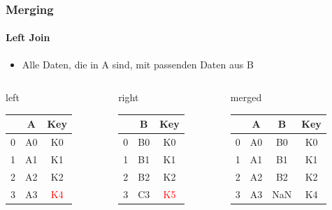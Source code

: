 \documentclass[12pt,ngerman]{beamer}
\def\firstcircle{(0,0) circle (2cm)}
\def\secondcircle{(0:3cm) circle (2cm)}
\begin{document}
\begin{frame}
\frametitle{Merging}
\framesubtitle{Left Join}

\begin{itemize}
\item Alle Daten, die in A sind, mit passenden Daten aus B
\end{itemize}

\begin{center}
\end{center}

{\footnotesize
\begin{columns}
\begin{column}{0.3\textwidth}
left \\
\begin{tabular}{c|cc} \toprule
   & A  &  Key \\ \midrule
0 & A0 &  K0 \\
1 & A1 &  K1 \\ 
2 & A2 &  K2 \\
3 & A3 &  \textcolor{red}{K4} \\ \bottomrule
\end{tabular}
\end{column}
\begin{column}{0.3\textwidth}
right \\
\begin{tabular}{c|cc} \toprule
   &  B   & Key \\ \midrule
0 &  B0 & K0 \\
1 &  B1 & K1 \\ 
2 &  B2 & K2 \\
3 &  C3 & \textcolor{red}{K5} \\ \bottomrule
\end{tabular}\end{column}
\begin{column}{0.3\textwidth}
merged \\
\begin{tabular}{c|ccc} \toprule
   & A  & B   & Key \\ \midrule
0 & A0 & B0 & K0 \\
1 & A1 & B1 & K1 \\ 
2 & A2 & B2 & K2 \\ \bottomrule
3 & A3 & NaN & K4 \\ \bottomrule
\end{tabular} \\
\vspace*{0.4em}
\end{column}
\end{columns}}

\end{frame}
\end{document}
